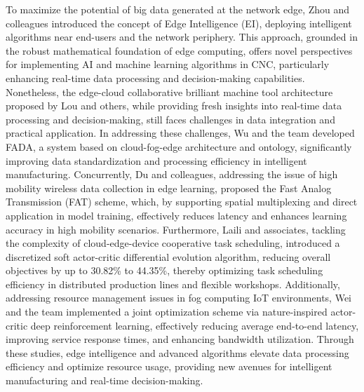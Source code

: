 \documentclass[preprint,12pt,authoryear]{elsarticle}
\begin{document}
To maximize the potential of big data generated at the network edge, Zhou and colleagues introduced the concept of Edge Intelligence (EI), deploying intelligent algorithms near end-users and the network periphery. This approach, grounded in the robust mathematical foundation of edge computing, offers novel perspectives for implementing AI and machine learning algorithms in CNC, particularly enhancing real-time data processing and decision-making capabilities. Nonetheless, the edge-cloud collaborative brilliant machine tool architecture proposed by Lou and others, while providing fresh insights into real-time data processing and decision-making, still faces challenges in data integration and practical application. In addressing these challenges, Wu and the team developed FADA, a system based on cloud-fog-edge architecture and ontology, significantly improving data standardization and processing efficiency in intelligent manufacturing. Concurrently, Du and colleagues, addressing the issue of high mobility wireless data collection in edge learning, proposed the Fast Analog Transmission (FAT) scheme, which, by supporting spatial multiplexing and direct application in model training, effectively reduces latency and enhances learning accuracy in high mobility scenarios. Furthermore, Laili and associates, tackling the complexity of cloud-edge-device cooperative task scheduling, introduced a discretized soft actor-critic differential evolution algorithm, reducing overall objectives by up to 30.82\% to 44.35\%, thereby optimizing task scheduling efficiency in distributed production lines and flexible workshops. Additionally, addressing resource management issues in fog computing IoT environments, Wei and the team implemented a joint optimization scheme via nature-inspired actor-critic deep reinforcement learning, effectively reducing average end-to-end latency, improving service response times, and enhancing bandwidth utilization. Through these studies, edge intelligence and advanced algorithms elevate data processing efficiency and optimize resource usage, providing new avenues for intelligent manufacturing and real-time decision-making.
\end{document}
